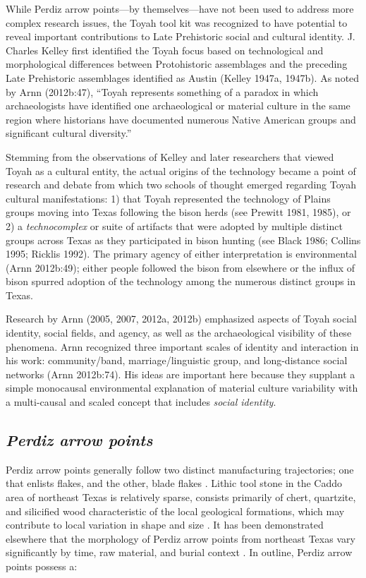 \documentclass[smallextended]{svjour3}       %
\begin{document}
While Perdiz arrow points---by themselves---have not been used to
address more complex research issues, the Toyah tool kit was recognized
to have potential to reveal important contributions to Late Prehistoric
social and cultural identity. J. Charles Kelley first identified the
Toyah focus based on technological and morphological differences between
Protohistoric assemblages and the preceding Late Prehistoric assemblages
identified as Austin (Kelley 1947a, 1947b). As noted by Arnn (2012b:47),
``Toyah represents something of a paradox in which archaeologists have
identified one archaeological or material culture in the same region
where historians have documented numerous Native American groups and
significant cultural diversity.''

Stemming from the observations of Kelley and later researchers that
viewed Toyah as a cultural entity, the actual origins of the technology
became a point of research and debate from which two schools of thought
emerged regarding Toyah cultural manifestations: 1) that Toyah
represented the technology of Plains groups moving into Texas following
the bison herds (see Prewitt 1981, 1985), or 2) a \emph{technocomplex}
or suite of artifacts that were adopted by multiple distinct groups
across Texas as they participated in bison hunting (see Black 1986;
Collins 1995; Ricklis 1992). The primary agency of either interpretation
is environmental (Arnn 2012b:49); either people followed the bison from
elsewhere or the influx of bison spurred adoption of the technology
among the numerous distinct groups in Texas.

Research by Arnn (2005, 2007, 2012a, 2012b) emphasized aspects of Toyah
social identity, social fields, and agency, as well as the
archaeological visibility of these phenomena. Arnn recognized three
important scales of identity and interaction in his work:
community/band, marriage/linguistic group, and long-distance social
networks (Arnn 2012b:74). His ideas are important here because they
supplant a simple monocausal environmental explanation of material
culture variability with a multi-causal and scaled concept that includes
\emph{social identity}.

\hypertarget{perdiz-arrow-points}{%
\subsection{\texorpdfstring{\emph{Perdiz arrow
points}}{Perdiz arrow points}}\label{perdiz-arrow-points}}

Perdiz arrow points generally follow two distinct manufacturing
trajectories; one that enlists flakes, and the other, blade flakes
\cite{RN8999,RN9361,RN9000,RN9364}. Lithic tool stone in the Caddo area
of northeast Texas is relatively sparse, consists primarily of chert,
quartzite, and silicified wood characteristic of the local geological
formations, which may contribute to local variation in shape and size
\cite{RN9364,RN439}. It has been demonstrated elsewhere that the
morphology of Perdiz arrow points from northeast Texas vary
significantly by time, raw material, and burial context \cite{RN9364}.
In outline, Perdiz arrow points possess a:
\end{document}
